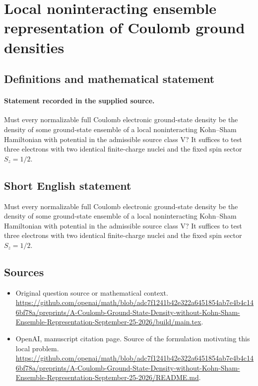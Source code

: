 \documentclass[11pt]{article}
\begin{document}
\section*{Local noninteracting ensemble representation of Coulomb ground densities}\label{30007218}
\subsection{Definitions and mathematical statement}
\paragraph{Statement recorded in the supplied source.}
Must every normalizable full Coulomb electronic ground-state density be the density of some ground-state ensemble of a local noninteracting Kohn–Sham Hamiltonian with potential in the admissible source class V? It suffices to test three electrons with two identical finite-charge nuclei and the fixed spin sector $S_z=1/2$.
\subsection{Short English statement}
Must every normalizable full Coulomb electronic ground-state density be the density of some ground-state ensemble of a local noninteracting Kohn–Sham Hamiltonian with potential in the admissible source class V? It suffices to test three electrons with two identical finite-charge nuclei and the fixed spin sector $S_z=1/2$.
\subsection{Sources}
\begin{itemize}
\item[S1] Original question source or mathematical context.
\url{https://github.com/openai/math/blob/adc7f1241b42e322a6451854ab7e4b4c146bf78a/preprints/A-Coulomb-Ground-State-Density-without-Kohn-Sham-Ensemble-Representation-September-25-2026/build/main.tex}.
\item[S2] OpenAI, manuscript citation page. Source of the formulation motivating this local problem.
\url{https://github.com/openai/math/blob/adc7f1241b42e322a6451854ab7e4b4c146bf78a/preprints/A-Coulomb-Ground-State-Density-without-Kohn-Sham-Ensemble-Representation-September-25-2026/README.md}.
\end{itemize}
\end{document}
